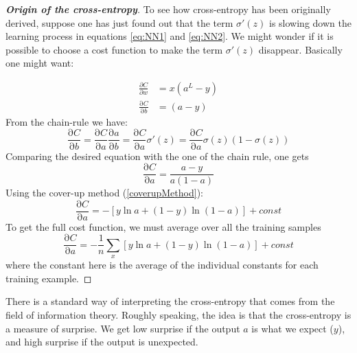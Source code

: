 \documentclass[12pt, letterpaper]{article}
\theoremstyle{definition}
\newcommand{\sz}{\sigma(z)}
\newcommand{\pr}{\mathrm{\partial}}
\let\tb\textbf
\begin{document}
\begin{proof}[\tb{Origin of the cross-entropy}]
To see how cross-entropy has been originally derived, suppose one has just found out that the term $\sigma'(z)$ is slowing down the learning process in equations \autoref{eq:NN1} and \autoref{eq:NN2}. We might wonder if it is possible to choose a cost function to make the term  $\sigma'(z)$ disappear. Basically one might want:

\begin{equation}
\begin{aligned}
\frac{\partial C}{\partial w} & =x \left( a^L - y\right)\\
\frac{\pr C}{\pr b} &=\left( a - y\right)
\end{aligned}
\end{equation}
From the chain-rule we have:
\begin{equation}
\frac{\pr C}{\pr b} =\frac{\pr C}{\pr a} \frac{\pr a}{\pr b }  =\frac{\pr C}{\pr a}\sigma'(z) = \frac{\pr C}{\pr a} \sz(1-\sz)
\end{equation}
Comparing the desired equation with the one of the chain rule, one gets
\begin{equation}
\frac{\pr C}{\pr a} = \frac{a-y}{a(1-a)} 
\end{equation}
Using the cover-up method (\autoref{coverupMethod}):
\begin{equation}
\frac{\pr C}{\pr a} = -\left[ y\ln a + (1-y)\ln(1-a)\right]+const
\end{equation}
To get the full cost function, we must average over all the training samples
\begin{equation}
\frac{\pr C}{\pr a} = -\frac{1}{n}\sum_x\left[y\ln a + (1-y)\ln(1-a)\right]+const
\end{equation}
where the constant here is the average of the individual constants for each training example.
\end{proof}

There is a standard way of interpreting the cross-entropy that comes from the field of information theory. Roughly speaking, the idea is that the cross-entropy is a measure of surprise. We get low surprise if the output $a$ is what we expect ($y$), and high surprise if the output is unexpected.
\end{document}
